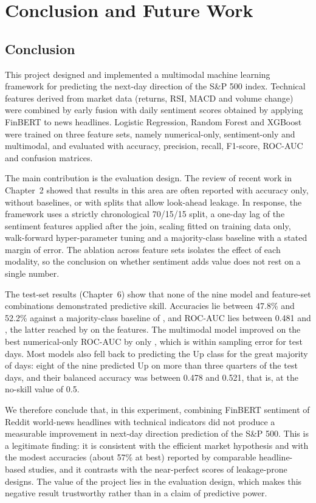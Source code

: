 \chapter{Conclusion and Future Work}

\section{Conclusion}
This project designed and implemented a multimodal machine learning framework for predicting the next-day direction of the S\&P 500 index. Technical features derived from market data (returns, RSI, MACD and volume change) were combined by early fusion with daily sentiment scores obtained by applying FinBERT to news headlines. Logistic Regression, Random Forest and XGBoost were trained on three feature sets, namely numerical-only, sentiment-only and multimodal, and evaluated with accuracy, precision, recall, F1-score, ROC-AUC and confusion matrices.

The main contribution is the evaluation design. The review of recent work in Chapter~2 showed that results in this area are often reported with accuracy only, without baselines, or with splits that allow look-ahead leakage. In response, the framework uses a strictly chronological 70/15/15 split, a one-day lag of the sentiment features applied after the join, scaling fitted on training data only, walk-forward hyper-parameter tuning and a majority-class baseline with a stated margin of error. The ablation across feature sets isolates the effect of each modality, so the conclusion on whether sentiment adds value does not rest on a single number.

The test-set results (Chapter~6) show that none of the nine model and feature-set combinations demonstrated predictive skill. Accuracies lie between 47.8\% and 52.2\% against a majority-class baseline of \BaselineAcc{}, and ROC-AUC lies between 0.481 and \BestAUC{}, the latter reached by \BestModel{} on the \BestFeatureSet{} features. The multimodal model improved on the best numerical-only ROC-AUC by only \AUCDelta{}, which is within sampling error for \TestDays{} test days. Most models also fell back to predicting the Up class for the great majority of days: eight of the nine predicted Up on more than three quarters of the test days, and their balanced accuracy was between 0.478 and 0.521, that is, at the no-skill value of 0.5.

We therefore conclude that, in this experiment, combining FinBERT sentiment of Reddit world-news headlines with technical indicators did not produce a measurable improvement in next-day direction prediction of the S\&P 500. This is a legitimate finding: it is consistent with the efficient market hypothesis and with the modest accuracies (about 57\% at best) reported by comparable headline-based studies, and it contrasts with the near-perfect scores of leakage-prone designs. The value of the project lies in the evaluation design, which makes this negative result trustworthy rather than in a claim of predictive power.

